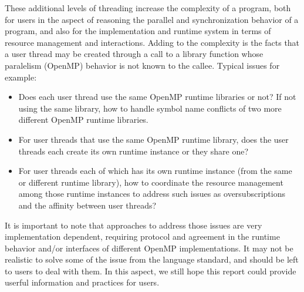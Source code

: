 These additional levels of threading increase the complexity of a program, both for 
users in the aspect of reasoning the parallel and synchronization behavior of a program, 
and also for the implementation and runtime system in terms of resource management and 
interactions. Adding to the complexity is the facts that a user thread may be created 
through a call to a library function whose paralelism (OpenMP) behavior is not known to 
the callee. Typical issues for example: 
\begin{itemize}
\item Does each user thread use the same OpenMP runtime libraries or not? 
	If not using the same library, how to handle symbol name 
	conflicts of two more different OpenMP runtime libraries. 
\item For user threads that use the same OpenMP runtime library, does the user threads each create its own runtime instance or they share one?
\item For user threads each of which has its own runtime instance (from the same or 
	different runtime library), how to coordinate the resource management among those
	runtime instances to address such issues as oversubscriptions and the affinity
	between user threads?
\end{itemize}

It is important to note that approaches to address those issues are very implementation
dependent, requiring protocol and agreement in the runtime behavior and/or interfaces 
of different OpenMP implementations. It may not be realistic to solve some of the issue
from the language standard, and should be left to users to deal with them. In this
aspect, we still hope this report could provide userful information and practices 
for users. 

